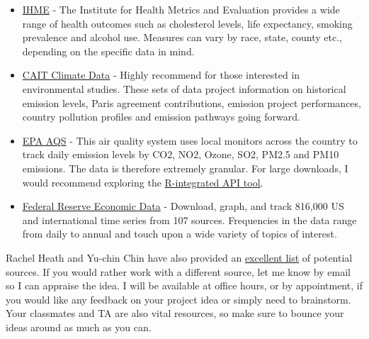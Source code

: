 \documentclass[addpoints, 12pt]{exam}
\begin{document}
\begin{itemize}
	\item \href{http://ghdx.healthdata.org/us-data}{IHME} - The Institute for Health Metrics and Evaluation provides a wide range of health outcomes such as cholesterol levels, life expectancy, smoking prevalence and alcohol use. 
	Measures can vary by race, state, county etc., depending on the specific data in mind. 
	\item \href{http://cait.wri.org/}{CAIT Climate Data} - Highly recommend for those interested in environmental studies. These sets of data project information on historical emission levels, Paris agreement contributions, emission project performances, country pollution profiles and emission pathways going forward. 
	\item \href{https://www.epa.gov/aqs}{EPA AQS} - This air quality system uses local monitors across the country to track daily emission levels by CO2, NO2, Ozone, SO2, PM2.5 and PM10 emissions. The data is therefore extremely granular. 
	For large downloads, I would recommend exploring the \href{https://cran.r-project.org/web/packages/RAQSAPI/vignettes/RAQSAPIvignette.html}{R-integrated API tool}. 
	\item \href{https://fred.stlouisfed.org/}{Federal Reserve Economic Data} - Download, graph, and track 816,000 US and international time series from 107 sources. 
	Frequencies in the data range from daily to annual and touch upon a wide variety of topics of interest.
\end{itemize}

Rachel Heath and Yu-chin Chin have also provided an \href{https://faculty.washington.edu/rmheath/datasources.html}{excellent list} of potential sources. 
If you would rather work with a different source, let me know by email so I can appraise the idea. 
I will be available at office hours, or by appointment, if you would like any feedback on your project idea or simply need to brainstorm.
Your classmates and TA are also vital resources, so make sure to bounce your ideas around as much as you can.\\
\end{document}
